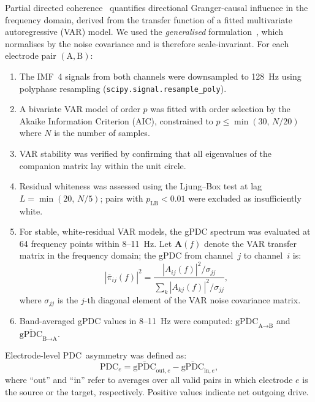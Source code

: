 \documentclass[11pt, a4paper]{article}
\begin{document}
Partial directed coherence~\citep{baccala2001partial} quantifies
directional Granger-causal influence in the frequency domain, derived from
the transfer function of a fitted multivariate autoregressive (VAR) model.
We used the \textit{generalised} formulation~\citep{baccala2007generalized},
which normalises by the noise covariance and is therefore scale-invariant.
For each electrode pair $(\text{A}, \text{B})$:

\begin{enumerate}
  \item The IMF~4 signals from both channels were downsampled to 128~Hz
        using polyphase resampling (\texttt{scipy.signal.resample\_poly}).
  \item A bivariate VAR model of order $p$ was fitted with order selection
        by the Akaike Information Criterion (AIC), constrained to
        $p \leq \min(30,\, N/20)$ where $N$ is the number of samples.
  \item VAR stability was verified by confirming that all eigenvalues of
        the companion matrix lay within the unit circle.
  \item Residual whiteness was assessed using the Ljung--Box test at lag
        $L = \min(20,\, N/5)$; pairs with $p_{\text{LB}} < 0.01$ were
        excluded as insufficiently white.
  \item For stable, white-residual VAR models, the gPDC spectrum was
        evaluated at 64 frequency points within 8--11~Hz. Let $\mathbf{A}(f)$
        denote the VAR transfer matrix in the frequency domain; the gPDC
        from channel~$j$ to channel~$i$ is:
        \begin{equation}
          |\bar{\pi}_{ij}(f)|^2 =
          \frac{|A_{ij}(f)|^2 / \sigma_{jj}}
               {\sum_k |A_{kj}(f)|^2 / \sigma_{jj}},
          \label{eq:gpdc}
        \end{equation}
        where $\sigma_{jj}$ is the $j$-th diagonal element of the VAR
        noise covariance matrix.
  \item Band-averaged gPDC values in 8--11~Hz were computed:
        $\overline{\text{gPDC}}_{\text{A}\to\text{B}}$ and
        $\overline{\text{gPDC}}_{\text{B}\to\text{A}}$.
\end{enumerate}

Electrode-level PDC~asymmetry was defined as:
%
\begin{equation}
  \text{PDC}_e = \bar{\text{gPDC}}_{\text{out},e} - \bar{\text{gPDC}}_{\text{in},e},
  \label{eq:pdc_asym}
\end{equation}
%
where ``out'' and ``in'' refer to averages over all valid pairs in which
electrode $e$ is the source or the target, respectively. Positive values
indicate net outgoing drive.
\end{document}
